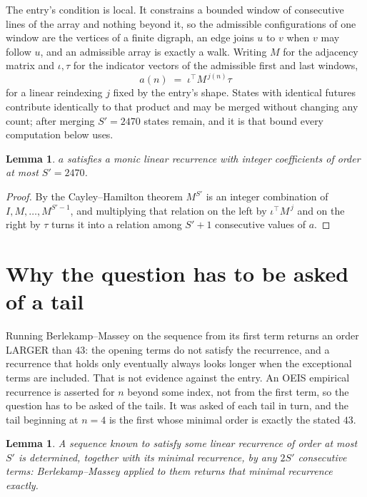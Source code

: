 \documentclass[11pt,a4paper]{article}
\theoremstyle{plain}
\newtheorem{lemma}[theorem]{Lemma}
\theoremstyle{definition}
\begin{document}
The entry's condition is local. It constrains a bounded window of consecutive lines of the
array and nothing beyond it, so the admissible configurations of one window are the vertices of
a finite digraph, an edge joins $u$ to $v$ when $v$ may follow $u$, and an admissible array is
exactly a walk. Writing $M$ for the adjacency matrix and $\iota,\tau$ for the indicator vectors
of the admissible first and last windows,
\[
a(n)\;=\;\iota^{\!\top}M^{\,j(n)}\tau
\]
for a linear reindexing $j$ fixed by the entry's shape. States with identical futures
contribute identically to that product and may be merged without changing any count; after
merging $S'=2470$ states remain, and it is that bound every computation below uses.

\begin{lemma}\label{lem:cf}
$a$ satisfies a monic linear recurrence with integer coefficients of order at most $S'=2470$.
\end{lemma}

\begin{proof}
By the Cayley--Hamilton theorem $M^{S'}$ is an integer combination of $I,M,\dots,M^{S'-1}$,
and multiplying that relation on the left by $\iota^{\!\top}M^{\,j}$ and on the right by
$\tau$ turns it into a relation among $S'+1$ consecutive values of $a$.
\end{proof}

\section{Why the question has to be asked of a tail}

Running Berlekamp--Massey on the sequence from its first term returns an order LARGER than $43$: the opening terms do not satisfy the recurrence, and a recurrence that holds only eventually always looks longer when the exceptional terms are included. That is not evidence against the entry. An OEIS empirical recurrence is asserted for $n$ beyond some index, not from the first term, so the question has to be asked of the tails. It was asked of each tail in turn, and the tail beginning at $n=4$ is the first whose minimal order is exactly the stated $43$.

\begin{lemma}\label{lem:bm}
A sequence known to satisfy some linear recurrence of order at most $S'$ is determined,
together with its minimal recurrence, by any $2S'$ consecutive terms: Berlekamp--Massey applied
to them returns that minimal recurrence exactly.
\end{lemma}
\end{document}
